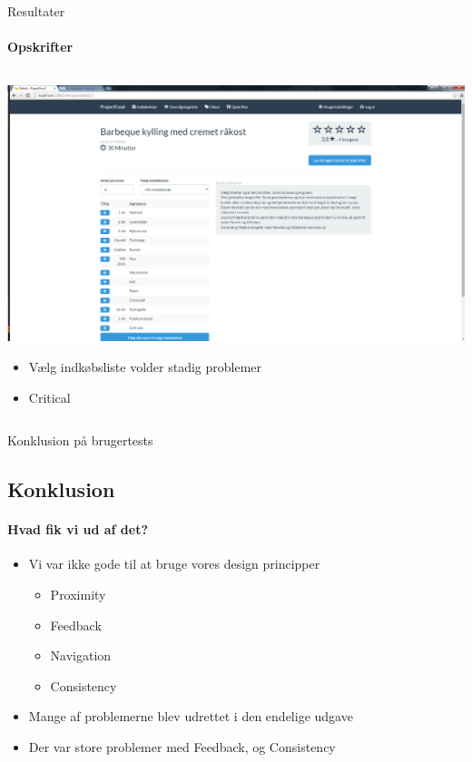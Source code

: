 \begin{frame}{Resultater}
\framesubtitle{Opskrifter}

	
	\begin{minipage}[0.3\textheight]{\textwidth}
	\begin{columns}[T]
	\begin{column}{1\textwidth}
	 \includegraphics[width=1\textwidth,height=1\textheight,keepaspectratio, trim={1cm 0 0 16mm}, clip]{images/Screenshots/PickedRecipe.png}
	 
	 	\begin{itemize}
	 		\item Vælg indkøbsliste volder stadig problemer
	 		\item Critical
	 	\end{itemize}
	
	\end{column}

	\end{columns}

  \end{minipage}
	
\end{frame}

\begin{frame}{Konklusion på brugertests}
\subsection{Konklusion}
\framesubtitle{Hvad fik vi ud af det?}

	
\begin{itemize}
	\item Vi var ikke gode til at bruge vores design principper
		\begin{itemize}
			\item Proximity
			\item Feedback
			\item Navigation
			\item Consistency
		\end{itemize}
	\item Mange af problemerne blev udrettet i den endelige udgave
	\item Der var store problemer med Feedback, og Consistency
\end{itemize}
  
\end{frame}


